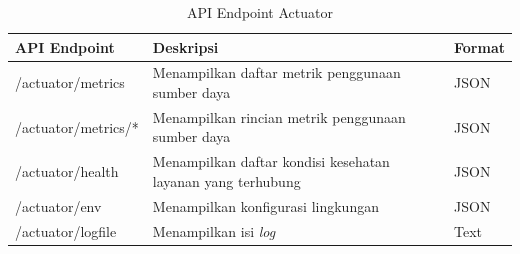 \begin{longtable}{|p{3cm}|p{4.5cm}|p{1.5cm}|}
	\caption{API Endpoint Actuator} \label{t:api_actuator} \\ \hline
	\textbf{API Endpoint} & \textbf{Deskripsi} & \textbf{Format} \\ \hline
	/actuator/metrics & Menampilkan daftar metrik penggunaan sumber daya & JSON \\ \hline
	/actuator/metrics/* & Menampilkan rincian metrik penggunaan sumber daya & JSON \\ \hline
	/actuator/health & Menampilkan daftar kondisi kesehatan layanan yang terhubung & JSON \\ \hline
	/actuator/env & Menampilkan konfigurasi lingkungan & JSON \\ \hline
	/actuator/logfile & Menampilkan isi \textit{log} & Text \\ \hline
\end{longtable}
